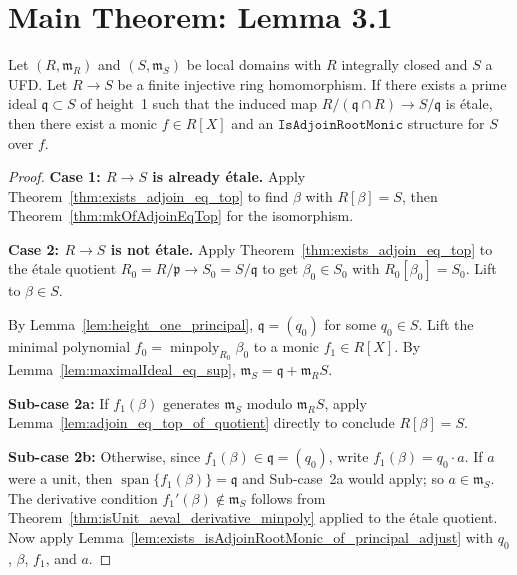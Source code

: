 \section{Main Theorem: Lemma 3.1}

\begin{theorem}
  \label{thm:exists_isAdjoinRootMonic_of_quotientMap_etale}
  \leanok
  Let $(R, \mathfrak{m}_R)$ and $(S, \mathfrak{m}_S)$ be local domains with
  $R$ integrally closed and $S$ a UFD.
  Let $R \to S$ be a finite injective ring homomorphism.
  If there exists a prime ideal $\mathfrak{q} \subset S$ of height~1 such that
  the induced map $R/(\mathfrak{q} \cap R) \to S/\mathfrak{q}$ is étale, then
  there exist a monic $f \in R[X]$ and an $\mathtt{IsAdjoinRootMonic}$ structure
  for $S$ over $f$.
\end{theorem}

\begin{proof}
  \leanok
  \textbf{Case 1: $R \to S$ is already étale.}
  Apply Theorem~\ref{thm:exists_adjoin_eq_top} to find $\beta$ with $R[\beta] = S$,
  then Theorem~\ref{thm:mkOfAdjoinEqTop} for the isomorphism.

  \textbf{Case 2: $R \to S$ is not étale.}
  Apply Theorem~\ref{thm:exists_adjoin_eq_top} to the étale quotient
  $R_0 = R/\mathfrak{p} \to S_0 = S/\mathfrak{q}$ to get $\beta_0 \in S_0$ with
  $R_0[\beta_0] = S_0$.  Lift to $\beta \in S$.

  By Lemma~\ref{lem:height_one_principal}, $\mathfrak{q} = (q_0)$ for some $q_0 \in S$.
  Lift the minimal polynomial $f_0 = \operatorname{minpoly}_{R_0} \beta_0$
  to a monic $f_1 \in R[X]$.
  By Lemma~\ref{lem:maximalIdeal_eq_sup},
  $\mathfrak{m}_S = \mathfrak{q} + \mathfrak{m}_R S$.

  \textbf{Sub-case 2a:} If $f_1(\beta)$ generates $\mathfrak{m}_S$ modulo
  $\mathfrak{m}_R S$, apply Lemma~\ref{lem:adjoin_eq_top_of_quotient} directly
  to conclude $R[\beta] = S$.

  \textbf{Sub-case 2b:} Otherwise, since $f_1(\beta) \in \mathfrak{q} = (q_0)$,
  write $f_1(\beta) = q_0 \cdot a$.  If $a$ were a unit, then
  $\operatorname{span}\{f_1(\beta)\} = \mathfrak{q}$ and Sub-case~2a would apply;
  so $a \in \mathfrak{m}_S$.
  The derivative condition $f_1'(\beta) \notin \mathfrak{m}_S$ follows from
  Theorem~\ref{thm:isUnit_aeval_derivative_minpoly} applied to the étale quotient.
  Now apply Lemma~\ref{lem:exists_isAdjoinRootMonic_of_principal_adjust}
  with $q_0$, $\beta$, $f_1$, and $a$.
\end{proof}

